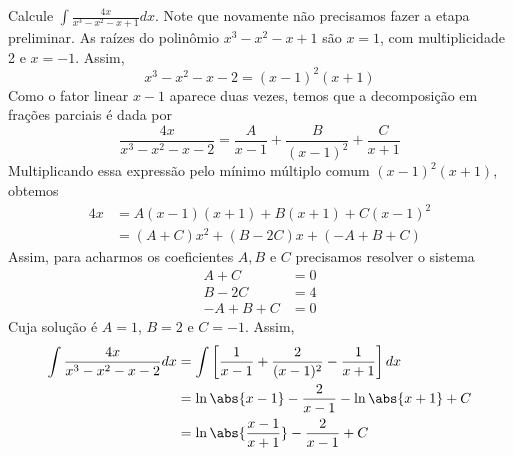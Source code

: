 \begin{example}
  Calcule \(\int \frac{4x}{x^3-x^2-x+1}dx\).
  \solution
  Note que novamente não precisamos fazer a etapa preliminar.
  As raízes do polinômio $x^3-x^2-x+1$ são $x=1$,
  com multiplicidade 2 e $x=-1$. Assim,
  \[
    x^3-x^2-x-2=(x-1)^2(x+1)
  \]
  Como o fator linear $x-1$ aparece duas vezes, temos que a decomposição
  em frações parciais é dada por
  \[
    \frac{4x}{x^3-x^2-x-2}
    = \frac{A}{x-1}
    + \frac{B}{(x-1)^2}
    + \frac{C}{x+1}
  \]
  Multiplicando essa expressão pelo mínimo múltiplo comum $(x-1)^2(x+1)$, obtemos
  \begin{align}
    4x & = A(x-1)(x+1)+B(x+1)+C(x-1)^2 \\
       & = (A+C)x^2+(B-2C)x+(-A+B+C)
  \end{align}
  Assim, para acharmos os coeficientes $A,B$ e $C$ precisamos resolver o sistema
  \begin{align*}
    A+C    & = 0 \\
    B-2C   & = 4 \\
    -A+B+C & = 0
  \end{align*}
  Cuja solução é $A=1$, $B=2$ e $C=-1$. Assim,
  \begin{align*}
    \int \frac{4x}{x^3-x^2-x-2}dx
    & = \int \left[ \frac{1}{x-1}+ \frac{2}{(x-1)^2}-\frac{1}{x+1} \right] dx \\
    & = \ln \abs{x-1}- \frac{2}{x-1}- \ln\abs{x+1}+C \\
    & = \ln \abs{\frac{x-1}{x+1}} - \frac{2}{x-1}+C
  \end{align*}
\end{example}

